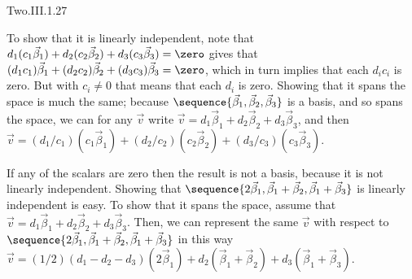 \begin{ans}{Two.III.1.27}
      \begin{exparts}
         \partsitem To show that it is linearly independent, note that
           \( d_1(c_1\vec{\beta}_1)+d_2(c_2\vec{\beta}_2)+d_3(c_3\vec{\beta}_3)
               =\zero \)
           gives that
           \( (d_1c_1)\vec{\beta}_1+(d_2c_2)\vec{\beta}_2+(d_3c_3)\vec{\beta}_3
               =\zero \), which in turn
           implies that each \( d_ic_i \) is zero.
           But with \( c_i\neq 0 \) that means that each \( d_i \) is zero.
           Showing that it spans the space is much the same;
           because $\sequence{\vec{\beta}_1,\vec{\beta}_2,\vec{\beta}_3}$
           is a basis, and so spans the space, we can for any $\vec{v}$ write
           \( \vec{v}=d_1\vec{\beta}_1+d_2\vec{\beta}_2+d_3\vec{\beta}_3 \),
           and then
           \( \vec{v}=(d_1/c_1)(c_1\vec{\beta}_1)
               +(d_2/c_2)(c_2\vec{\beta}_2)+(d_3/c_3)(c_3\vec{\beta}_3) \).

           If any of the scalars are zero then the result is not a basis,
           because it is not linearly independent.
         \partsitem Showing that
           $\sequence{2\vec{\beta}_1,\vec{\beta}_1+\vec{\beta}_2,
             \vec{\beta}_1+\vec{\beta}_3}$ is linearly independent is easy.
           To show that it spans the space, assume that
           \( \vec{v}=d_1\vec{\beta}_1+d_2\vec{\beta}_2+d_3\vec{\beta}_3 \).
           Then, we can represent the same \( \vec{v} \) with respect to
           \( \sequence{2\vec{\beta}_1,\vec{\beta}_1+\vec{\beta}_2,
                         \vec{\beta}_1+\vec{\beta}_3} \)
           in this way
           $\vec{v}=(1/2)(d_1-d_2-d_3)(2\vec{\beta}_1)
           +d_2(\vec{\beta}_1+\vec{\beta}_2)+d_3(\vec{\beta}_1+\vec{\beta}_3)$.
      \end{exparts}
    
\end{ans}
